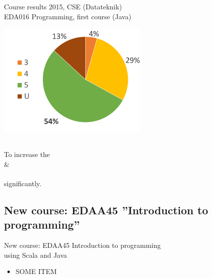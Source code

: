 \documentclass{lecturenotes}
\begin{document}
\begin{Slide}{Course results 2015, CSE (Datateknik)\\EDA016 Programming, first course (Java)}
\begin{multicols}{2}

  \vspace{1em}

\includegraphics[width=0.55\textwidth]{grades-2015}

\columnbreak

\raggedleft {} \\
To increase the \\  \& \\   \\ significantly.
\end{multicols}
\end{Slide}

\subsection[New course: EDAA45 ''Introduction to programming'']{New course: EDAA45 ''Introduction to programming''}


\begin{Slide}{New course: EDAA45 Introduction to programming \\ using Scala and Java}
\begin{itemize}
\item SOME ITEM
\end{itemize}
\end{Slide}
\end{document}
